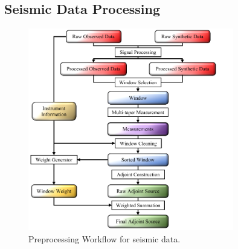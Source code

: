 \documentclass[extra,mreferee]{gji}
\begin{document}
\subsection{Seismic Data Processing}

\begin{figure}
  \centering
  \includegraphics[width=0.8\textwidth]{figures/Preprocess_workflow.pdf}
  \caption{Preprocessing Workflow for seismic data.}
  \label{fig:preprocess_workflow}
\end{figure}
\end{document}
